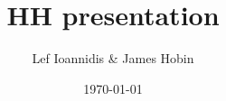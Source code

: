 \documentclass{beamer}
\title[A long duration constant current applied to the HH model produces a train of action potentials.]{HH presentation}
\author{Lef Ioannidis \& James Hobin}
\institute{MIT EECS}
\date{\today}
\begin{document}
\begin{frame}
  \titlepage
\end{frame}
\end{document}
